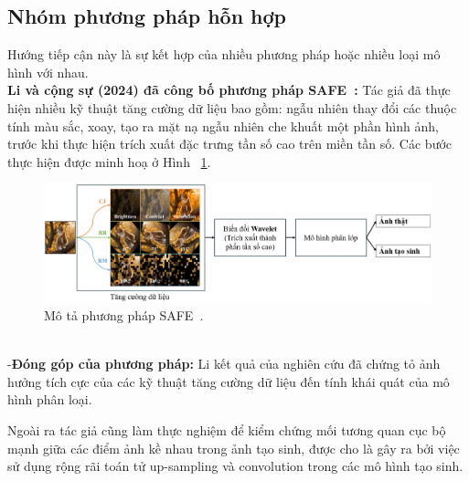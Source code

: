\subsection{Nhóm phương pháp hỗn hợp}
Hướng tiếp cận này là sự kết hợp của nhiều phương pháp hoặc nhiều loại mô hình với nhau.\\
%
\textbf{Li và cộng sự (2024) đã công bố phương pháp SAFE~\cite{li2024improving}:}
%
Tác giả đã thực hiện nhiều kỹ thuật tăng cường dữ liệu bao gồm: ngẫu nhiên thay đổi các thuộc tính màu sắc, xoay, tạo ra mặt nạ ngẫu nhiên che khuất một phần hình ảnh, trước khi thực hiện trích xuất đặc trưng tần số cao trên miền tần số. Các bước thực hiện được minh hoạ ở Hình ~\ref{fig:model-SAFE-1}. 
%	
\begin{figure}[ht!]
	\centering
	\includegraphics[width=1.0\linewidth]{Images/model-SAFE-1.png}	\begin{minipage}{0.9\linewidth}
		\caption{Mô tả phương pháp SAFE~\cite{li2024improving}.}
		\label{fig:model-SAFE-1}
	\end{minipage}
\end{figure}\\
%
%
%
-\textbf{Đóng góp của phương pháp:}
%
Li kết quả của nghiên cứu đã chứng tỏ ảnh hưởng tích cực của các kỹ thuật tăng cường dữ liệu đến tính khái quát của mô hình phân loại.

Ngoài ra tác giả cũng làm thực nghiệm để kiểm chứng mối tương quan cục bộ mạnh giữa các điểm ảnh kề nhau trong ảnh tạo sinh, được cho là gây ra bởi việc sử dụng rộng rãi toán tử \gls{up-sampling} và \gls{convolution} trong các mô hình tạo sinh.
%

%






